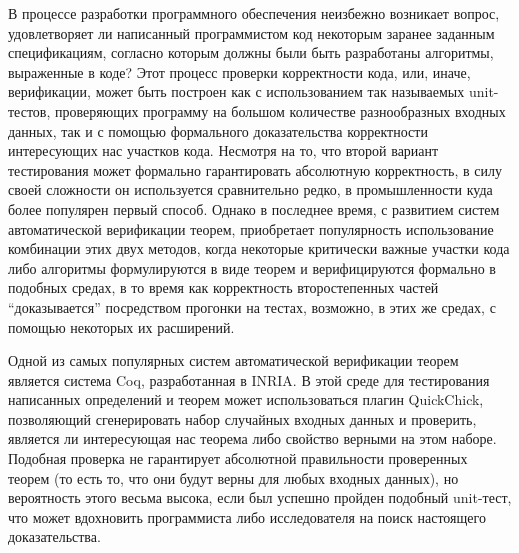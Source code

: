 



\usepackage{fancyvrb}
\usepackage{tikz}
\usepackage{float}
\usepackage{stmaryrd}
\usepackage{mathrsfs}
\usetikzlibrary{arrows}


\DeclareMathOperator{\bttr}{T\_tr}
\DeclareMathOperator{\btnil}{T\_nil}

\newcommand{\tbttr}{T\_tr}
\newcommand{\tcoq}{Coq}
\newcommand{\tqc}{QuickChick}


\Intro

В процессе разработки программного обеспечения неизбежно возникает вопрос, удовлетворяет ли написанный программистом код некоторым заранее заданным спецификациям, согласно которым должны были быть разработаны алгоритмы, выраженные в коде? Этот процесс проверки корректности кода, или, иначе, верификации, может быть построен как с использованием так называемых unit-тестов, проверяющих программу на большом количестве разнообразных входных данных, так и с помощью формального доказательства корректности интересующих нас участков кода. Несмотря на то, что второй вариант тестирования может формально гарантировать абсолютную корректность, в силу своей сложности он используется сравнительно редко, в промышленности куда более популярен первый способ. Однако в последнее время, с развитием систем автоматической верификации теорем, приобретает популярность использование комбинации этих двух методов, когда некоторые критически важные участки кода либо алгоритмы формулируются в виде теорем и верифицируются формально в подобных средах, в то время как корректность второстепенных частей ``доказывается'' посредством прогонки на тестах, возможно, в этих же средах, с помощью некоторых их расширений.

Одной из самых популярных систем автоматической верификации теорем является система \tcoq, разработанная в INRIA. В этой среде для тестирования написанных определений и теорем может использоваться плагин \tqc, позволяющий сгенерировать набор случайных входных данных и проверить, является ли интересующая нас теорема либо свойство верными на этом наборе. Подобная проверка не гарантирует абсолютной правильности проверенных теорем (то есть то, что они будут верны для любых входных данных), но вероятность этого весьма высока, если был успешно пройден подобный unit-тест, что может вдохновить программиста либо исследователя на поиск настоящего доказательства.

